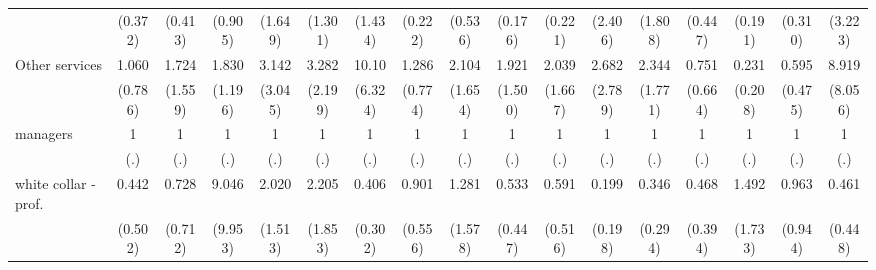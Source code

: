 {\begin{tabular}{l*{16}{c}}
                    &     (0.372)         &     (0.413)         &     (0.905)         &     (1.649)         &     (1.301)         &     (1.434)         &     (0.222)         &     (0.536)         &     (0.176)         &     (0.221)         &     (2.406)         &     (1.808)         &     (0.447)         &     (0.191)         &     (0.310)         &     (3.223)         \\
[1em]
Other services      &       1.060         &       1.724         &       1.830         &       3.142         &       3.282         &       10.10\sym{***}&       1.286         &       2.104         &       1.921         &       2.039         &       2.682         &       2.344         &       0.751         &       0.231         &       0.595         &       8.919\sym{*}  \\
                    &     (0.786)         &     (1.559)         &     (1.196)         &     (3.045)         &     (2.199)         &     (6.324)         &     (0.774)         &     (1.654)         &     (1.500)         &     (1.667)         &     (2.789)         &     (1.771)         &     (0.664)         &     (0.208)         &     (0.475)         &     (8.056)         \\
[1em]
managers            &           1         &           1         &           1         &           1         &           1         &           1         &           1         &           1         &           1         &           1         &           1         &           1         &           1         &           1         &           1         &           1         \\
                    &         (.)         &         (.)         &         (.)         &         (.)         &         (.)         &         (.)         &         (.)         &         (.)         &         (.)         &         (.)         &         (.)         &         (.)         &         (.)         &         (.)         &         (.)         &         (.)         \\
[1em]
white collar - prof.&       0.442         &       0.728         &       9.046\sym{*}  &       2.020         &       2.205         &       0.406         &       0.901         &       1.281         &       0.533         &       0.591         &       0.199         &       0.346         &       0.468         &       1.492         &       0.963         &       0.461         \\
                    &     (0.502)         &     (0.712)         &     (9.953)         &     (1.513)         &     (1.853)         &     (0.302)         &     (0.556)         &     (1.578)         &     (0.447)         &     (0.516)         &     (0.198)         &     (0.294)         &     (0.394)         &     (1.733)         &     (0.944)         &     (0.448)         \\

\end{tabular}}
